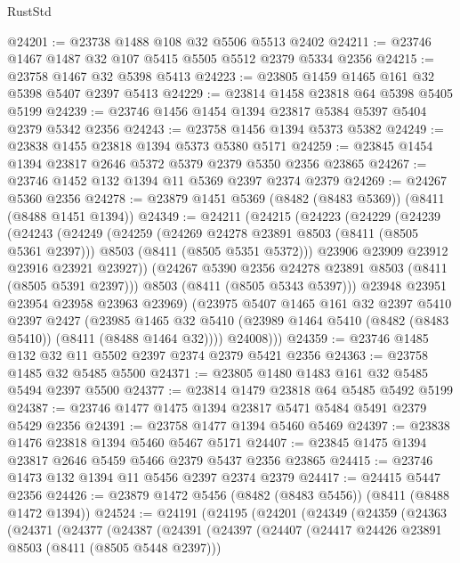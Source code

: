 \begin{lexlean}{RustStd}
\begin{coremodule}
@24201 := @23738 @1488 @108 @32 @5506 @5513 @2402
@24211 := @23746 @1467 @1487 @32 @107 @5415 @5505 @5512 @2379 @5334 @2356
@24215 := @23758 @1467 @32 @5398 @5413
@24223 := @23805 @1459 @1465 @161 @32 @5398 @5407 @2397 @5413
@24229 := @23814 @1458 @23818 @64 @5398 @5405 @5199
@24239 := @23746 @1456 @1454 @1394 @23817 @5384 @5397 @5404 @2379 @5342 @2356
@24243 := @23758 @1456 @1394 @5373 @5382
@24249 := @23838 @1455 @23818 @1394 @5373 @5380 @5171
@24259 := @23845 @1454 @1394 @23817 @2646 @5372 @5379 @2379 @5350 @2356 @23865
@24267 := @23746 @1452 @132 @1394 @11 @5369 @2397 @2374 @2379
@24269 := @24267 @5360 @2356
@24278 := @23879 @1451 @5369 (@8482 (@8483 @5369)) (@8411 (@8488 @1451 @1394))
@24349 := @24211
    (@24215
      (@24223
        (@24229
          (@24239
            (@24243
              (@24249
                (@24259
                  (@24269 @24278 @23891 @8503 (@8411 (@8505 @5361 @2397)))
                  @8503
                  (@8411 (@8505 @5351 @5372)))
                @23906
                @23909
                @23912
                @23916
                @23921
                @23927))
            (@24267 @5390 @2356 @24278 @23891 @8503 (@8411 (@8505 @5391 @2397)))
            @8503
            (@8411 (@8505 @5343 @5397)))
          @23948
          @23951
          @23954
          @23958
          @23963
          @23969)
        (@23975
          @5407
          @1465
          @161
          @32
          @2397
          @5410
          @2397
          @2427
          (@23985
            @1465
            @32
            @5410
            (@23989 @1464 @5410 (@8482 (@8483 @5410)) (@8411 (@8488 @1464 @32))))
          @24008)))
@24359 := @23746 @1485 @132 @32 @11 @5502 @2397 @2374 @2379 @5421 @2356
@24363 := @23758 @1485 @32 @5485 @5500
@24371 := @23805 @1480 @1483 @161 @32 @5485 @5494 @2397 @5500
@24377 := @23814 @1479 @23818 @64 @5485 @5492 @5199
@24387 := @23746 @1477 @1475 @1394 @23817 @5471 @5484 @5491 @2379 @5429 @2356
@24391 := @23758 @1477 @1394 @5460 @5469
@24397 := @23838 @1476 @23818 @1394 @5460 @5467 @5171
@24407 := @23845 @1475 @1394 @23817 @2646 @5459 @5466 @2379 @5437 @2356 @23865
@24415 := @23746 @1473 @132 @1394 @11 @5456 @2397 @2374 @2379
@24417 := @24415 @5447 @2356
@24426 := @23879 @1472 @5456 (@8482 (@8483 @5456)) (@8411 (@8488 @1472 @1394))
@24524 := @24191
    (@24195
      (@24201
        (@24349
          (@24359
            (@24363
              (@24371
                (@24377
                  (@24387
                    (@24391
                      (@24397
                        (@24407
                          (@24417 @24426 @23891 @8503 (@8411 (@8505 @5448 @2397)))

\end{coremodule}
\end{lexlean}
